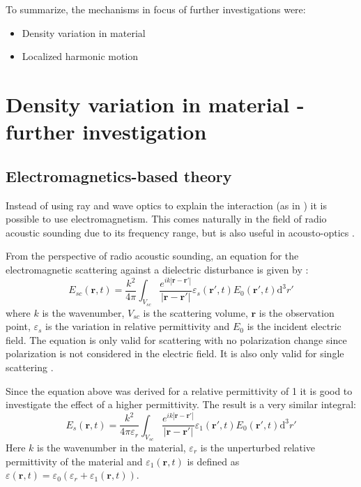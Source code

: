 \documentclass[10pt,a4paper,draft]{scrartcl}
\begin{document}
	To summarize, the mechanisms in focus of further investigations were:
	\begin{itemize}
		\item Density variation in material
		\item Localized harmonic motion
	\end{itemize}
	
	\section{Density variation in material - further investigation}
	
	\subsection{Electromagnetics-based theory}
	Instead of using ray and wave optics to explain the interaction (as in \cite{Saleh2007}) it is possible to use electromagnetism. This comes naturally in the field of radio acoustic sounding due to its frequency range, but is also useful in acousto-optics \cite{Korpel1988}. 
	
	From the perspective of radio acoustic sounding, an equation for the electromagnetic scattering against a dielectric disturbance is given by \cite{Gurvich1987}:
	\begin{equation*}
	E_{sc}(\bm{r},t) = \frac{k^2}{4\pi} \int_{V_{sc}} \frac{e^{ik \left| \bm{r}-\bm{r'} \right| }}{ \left| \bm{r}-\bm{r'} \right| } \varepsilon_s (\bm{r'},t) E_0 (\bm{r'},t) \mathrm{d}^3r'
	\end{equation*}
	where $k$ is the wavenumber, $V_{sc}$ is the scattering volume, $\bm{r}$ is the observation point, $\varepsilon_s$ is the variation in relative permittivity and $E_0$ is the incident electric field. The equation is only valid for scattering with no polarization change since polarization is not considered in the electric field. It is also only valid for single scattering \cite{Gurvich1987}.
	
	Since the equation above was derived for a relative permittivity of 1 it is good to investigate the effect of a higher permittivity. The result is a very similar integral: 
	\begin{equation*}
	E_{s}(\bm{r},t) = \frac{k^2}{4\pi\varepsilon_r} \int_{V_{sc}} \frac{e^{ik \left| \bm{r}-\bm{r'} \right| }}{ \left| \bm{r}-\bm{r'} \right| } \varepsilon_1 (\bm{r'},t) E_0 (\bm{r'},t) \mathrm{d}^3r'
	\end{equation*}
	Here $k$ is the wavenumber in the material, $\varepsilon_r$ is the unperturbed relative permittivity of the material and $\varepsilon_1 (\bm{r},t)$ is defined as $\varepsilon (\bm{r},t) = \varepsilon_0 (\varepsilon_r + \varepsilon_1 (\bm{r},t))$.
	
\end{document}
